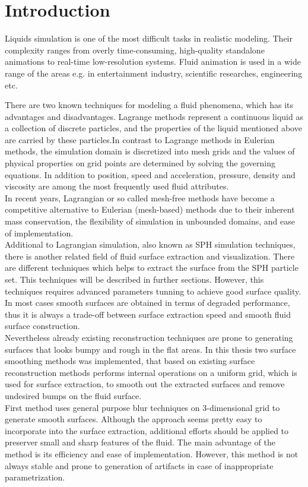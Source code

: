 \chapter{Introduction}
Liquids simulation is one of the most difficult tasks in realistic modeling. Their complexity ranges from overly time-consuming, high-quality standalone animations to real-time low-resolution systems. Fluid animation is used in a wide range of the areas e.g. in entertainment industry, scientific researches, engineering etc. 

There are two known techniques for modeling a fluid phenomena, which has its advantages and disadvantages. Lagrange methods represent a continuous liquid as a collection of discrete particles, and the properties of the liquid mentioned above are carried by these particles.In contrast to Lagrange methods in Eulerian methods, the simulation domain is discretized into mesh grids and the values of physical properties on grid points are determined by solving the governing equations. In addition to position, speed and acceleration, pressure, density and viscosity are among the most frequently used fluid attributes.\\
In recent years, Lagrangian or so called mesh-free methods have become a competitive alternative to Eulerian (mesh-based) methods due to their inherent mass conservation, the flexibility of simulation in unbounded domains, and ease of implementation.\\
Additional to Lagrangian simulation, also known as SPH simulation techniques, there is another related field of fluid surface extraction and visualization. There are different techniques which helps to extract the surface from the SPH particle set. This techniques will be described in further sections. However, this techniques requires advanced parameters tunning to achieve good surface quality. In most cases smooth surfaces are obtained in terms of degraded performance, thus it is always a trade-off between surface extraction speed and smooth fluid surface construction.\\
Nevertheless already existing reconstruction techniques are prone to generating surfaces that looks bumpy and rough in the flat areas. In this thesis two surface smoothing methods was implemented, that based on existing surface reconstruction methods performs internal operations on a uniform grid, which is used for surface extraction, to smooth out the extracted surfaces and remove undesired bumps on the fluid surface.\\
First method uses general purpose blur techniques on 3-dimensional grid to generate smooth surfaces. Although the approach seems pretty easy to incorporate into the surface extraction, additional efforts should be applied to preserver small and sharp features of the fluid. The main advantage of the method is its efficiency and ease of implementation. However, this method is not always stable and prone to generation of artifacts in case of inappropriate parametrization.\\
